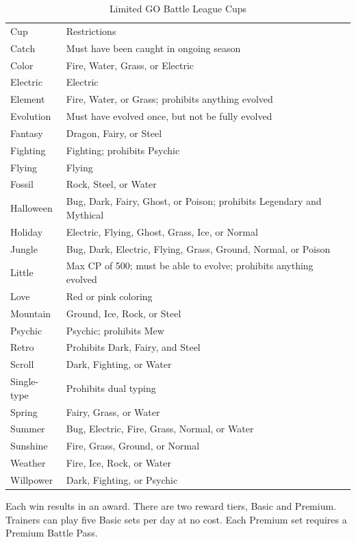 \begin{table}
\centering
\footnotesize
\begin{tabular}{ll}
Cup & Restrictions \\
\Midrule
Catch & Must have been caught in ongoing season\\
Color & Fire, Water, Grass, or Electric\\
Electric & Electric\\
Element & Fire, Water, or Grass; prohibits anything evolved\\
Evolution & Must have evolved once, but not be fully evolved\\
Fantasy & Dragon, Fairy, or Steel\\
Fighting & Fighting; prohibits Psychic\\
Flying & Flying\\
Fossil & Rock, Steel, or Water\\
Halloween & Bug, Dark, Fairy, Ghost, or Poison; prohibits Legendary and Mythical\\
Holiday & Electric, Flying, Ghost, Grass, Ice, or Normal\\
Jungle & Bug, Dark, Electric, Flying, Grass, Ground, Normal, or Poison\\
Little & Max CP of 500; must be able to evolve; prohibits anything evolved\\
Love & Red or pink coloring\\
Mountain & Ground, Ice, Rock, or Steel\\
Psychic & Psychic; prohibits Mew\\
Retro & Prohibits Dark, Fairy, and Steel\\
Scroll & Dark, Fighting, or Water\\
Single-type & Prohibits dual typing\\
Spring & Fairy, Grass, or Water\\
Summer & Bug, Electric, Fire, Grass, Normal, or Water\\
Sunshine & Fire, Grass, Ground, or Normal\\
Weather & Fire, Ice, Rock, or Water\\
Willpower & Dark, Fighting, or Psychic\\
\end{tabular}
\caption{Limited GO Battle League Cups\label{table:gblcups}}
\end{table}
Each win results in an award.
There are two reward tiers, Basic and Premium.
Trainers can play five Basic sets per day at no cost.
Each Premium set requires a Premium Battle Pass.
